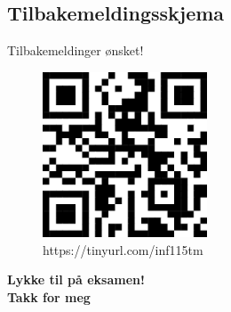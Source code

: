 







\subsection*{Tilbakemeldingsskjema}
\begin{frame}{Tilbakemeldinger ønsket!}
    \begin{figure}
        \centering
        \includegraphics[height = 4.9cm]{images/qrtilbakemelding.png}
        \caption{https://tinyurl.com/inf115tm}
        \label{fig:qrcodetilbakemelding}
    \end{figure}
\end{frame}

\begin{frame}
\begin{center}
\begin{Large}
\textbf{Lykke til på eksamen!\\[5mm]
Takk for meg}
\end{Large}
\end{center}  
\end{frame}